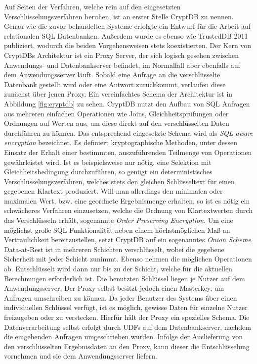 Auf Seiten der Verfahren, welche rein auf den eingesetzten Verschlüsselungsverfahren beruhen, ist an erster Stelle CryptDB \cite{Popa2011}\cite{Popa2012} zu nennen. Genau wie die zuvor behandelten Systeme erfolgte ein Entwurf für die Arbeit auf relationalen SQL Datenbanken. Außerdem wurde es ebenso wie TrustedDB 2011 publiziert, wodurch die beiden Vorgehensweisen stets koexistierten. Der Kern von CryptDBs Architektur ist ein Proxy Server, der sich logisch gesehen zwischen Anwendungs- und Datenbankserver befindet, im Normalfall aber ebenfalls auf dem Anwendungsserver läuft.  Sobald eine Anfrage an die verschlüsselte Datenbank gestellt wird oder eine Antwort zurückkommt, verlaufen diese zunächst über jenen Proxy. Ein vereinfachtes Schema der Architektur ist in Abbildung \ref{fig:cryptdb} zu sehen. CryptDB nutzt den Aufbau von SQL Anfragen aus mehreren einfachen Operationen wie Joins, Gleichheitsprüfungen oder Ordnungen auf Werten aus, um diese direkt auf den verschlüsselten Daten durchführen zu können. Das entsprechend eingesetzte Schema wird als \textit{SQL aware encryption} bezeichnet. Es definiert kryptographische Methoden, unter dessen Einsatz der Erhalt einer bestimmten, auszuführenden Teilmenge von Operationen gewährleistet wird. Ist es beispielsweise nur nötig, eine Selektion mit Gleichheitsbedingung durchzuführen, so genügt ein deterministisches Verschlüsselungsverfahren, welches stets den gleichen Schlüsseltext für einen gegebenen Klartext produziert. Will man allerdings den minimalen oder maximalen Wert, bzw. eine geordnete Ergebnismenge erhalten, so ist es nötig ein schwächeres Verfahren einzusetzen, welche die Ordnung von Klartextwerten durch das Verschlüsseln erhält, sogenannte \textit{Order Preserving Encryption}. Um eine möglichst große \ac{SQL} Funktionalität neben einem höchstmöglichen Maß an Vertraulichkeit bereitzustellen, setzt CryptDB auf ein sogenanntes \textit{Onion Scheme}. Data-at-Rest ist in mehreren Schichten verschlüsselt, wobei die gegebene Sicherheit mit jeder Schicht zunimmt. Ebenso nehmen die möglichen Operationen ab. Entschlüsselt wird dann nur bis zu der Schicht, welche für die aktuellen Berechnungen erforderlich ist. Die benutzten Schlüssel liegen je Nutzer auf dem Anwendungsserver. Der Proxy selbst besitzt jedoch einen Masterkey, um Anfragen umschreiben zu können. Da jeder Benutzer des Systems über einen individuellen Schlüssel verfügt, ist es möglich, gewisse Daten für einzelne Nutzer freizugeben oder zu verstecken. Hierfür hält der Proxy ein spezielles Schema. Die Datenverarbeitung selbst erfolgt durch \acp{UDF} auf dem Datenbankserver, nachdem die eingehenden Anfragen umgeschrieben wurden. Infolge der Auslieferung von den verschlüsselten Ergebnisdaten an den Proxy, kann dieser die Entschlüsselung vornehmen und sie dem Anwendungsserver liefern.

